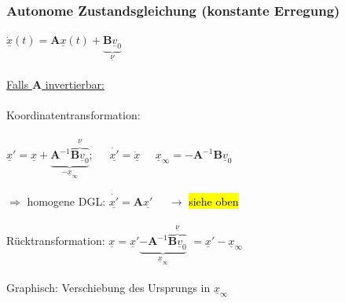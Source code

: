 \documentclass[a4paper,twocolumn,10pt]{article}
\begin{document}
\subsubsection*{Autonome Zustandsgleichung (konstante Erregung)}
$\underline{\dot{x}}(t)=\textbf{A}\underline{x}(t)+\underbrace{\textbf{B}\underline{v}_0}_{\underline{\nu}}$\\\\
\underline{Falls $\textbf{A}$ invertierbar:}\\\\
Koordinatentransformation:\\\\ $\underline{x}'=\underline{x}+\underbrace{\textbf{A}^{-1}\overbrace{\textbf{B}\underline{v}_0}^{\underline{\nu}}}_{-\underline{x}_{\infty}};\;\;\;\;\;\underline{\dot{x'}}=\underline{\dot{x}} \;\;\;\;\; \underline{x}_\infty= -\textbf{A}^{-1}\textbf{B}\underline{v}_0$\\\\
$\Rightarrow$ homogene DGL: $\underline{\dot{x'}}=\textbf{A}\underline{x'}\;\;\;\;\;\rightarrow$ \hl{siehe oben}\\\\
Rücktransformation: $\underline{x}=\underline{x}'\underbrace{-\textbf{A}^{-1} \overbrace{\textbf{B}\underline{v}_0}^{\underline{\nu}}}_{\underline{x}_{\infty}}$
\quad
$= \underline{x}'-\underline{x}_{\infty} $\\\\
Graphisch: Verschiebung des Ursprungs in $\underline{x}_{\infty}$
\end{document}
